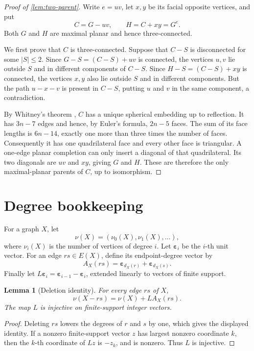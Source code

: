 \documentclass[11pt]{article}
\newtheorem{lemma}[theorem]{Lemma}
\theoremstyle{definition}
\theoremstyle{remark}
\newcommand{\eps}{\boldsymbol\varepsilon}
\begin{document}
\begin{proof}[Proof of \cref{lem:two-parent}]
Write \(e=uv\), let \(x,y\) be its facial opposite vertices, and put
\[
                  C=G-uv,\qquad H=C+xy=G^e.
\]
Both \(G\) and \(H\) are maximal planar and hence three-connected.

We first prove that \(C\) is three-connected.  Suppose that \(C-S\) is
disconnected for some \(|S|\le2\).  Since \(G-S=(C-S)+uv\) is connected,
the vertices \(u,v\) lie outside \(S\) and in different components of
\(C-S\).  Since \(H-S=(C-S)+xy\) is connected, the vertices \(x,y\) also
lie outside \(S\) and in different components.  But the path \(u-x-v\) is
present in \(C-S\), putting \(u\) and \(v\) in the same component, a
contradiction.

By Whitney's theorem \cite{Whitney1932}, \(C\) has a unique spherical
embedding up to reflection.  It has \(3n-7\) edges and hence, by Euler's
formula, \(2n-5\) faces.  The sum of its face lengths is \(6n-14\), exactly
one more than three times the number of faces.  Consequently it has one
quadrilateral face and every other face is triangular.  A one-edge planar
completion can only insert a diagonal of that quadrilateral.  Its two
diagonals are \(uv\) and \(xy\), giving \(G\) and \(H\).  These are
therefore the only maximal-planar parents of \(C\), up to isomorphism.
\end{proof}

\section{Degree bookkeeping}\label{app:degree-bookkeeping}

For a graph \(X\), let
\[
  \nu(X)=(\nu_0(X),\nu_1(X),\ldots),
\]
where \(\nu_i(X)\) is the number of vertices of degree \(i\).  Let
\(\eps_i\) be the \(i\)-th unit vector.  For an edge \(rs\in E(X)\), define
its endpoint-degree vector by
\[
             A_X(rs)=\eps_{d_X(r)}+\eps_{d_X(s)}.
\]
Finally let \(L\eps_i=\eps_{i-1}-\eps_i\), extended linearly to vectors of
finite support.

\begin{lemma}[Deletion identity]\label{lem:deletion-identity}
For every edge \(rs\) of \(X\),
\[
             \nu(X-rs)=\nu(X)+L A_X(rs).
\]
The map \(L\) is injective on finite-support integer vectors.
\end{lemma}

\begin{proof}
Deleting \(rs\) lowers the degrees of \(r\) and \(s\) by one, which gives
the displayed identity.  If a nonzero finite-support vector \(z\) has
largest nonzero coordinate \(k\), then the \(k\)-th coordinate of \(Lz\)
is \(-z_k\), and is nonzero.  Thus \(L\) is injective.
\end{proof}
\end{document}

